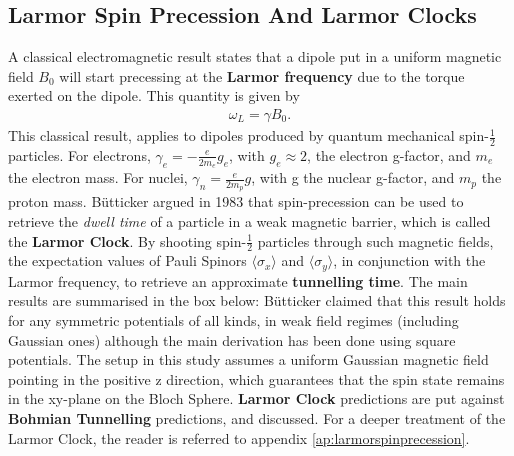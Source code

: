 \subsection{Larmor Spin Precession And Larmor Clocks}
A classical electromagnetic result states that a dipole put in a uniform magnetic field $B_0$ will start precessing at the \textbf{Larmor frequency} due to the torque exerted on the dipole. This quantity is given by
\begin{align}
    \omega_L = \gamma B_0.
\end{align}
This classical result, applies to dipoles produced by quantum mechanical spin-$\frac{1}{2}$ particles. For electrons, $\gamma_e=-\frac{e}{2m_e}g_e$, with $g_e \approx2$, the electron g-factor, and $m_e$ the electron mass. For nuclei, $\gamma_n = \frac{e}{2 m_p}g$, with g the nuclear g-factor, and $m_p$ the proton mass. Bütticker argued in 1983 \cite{Buttiker1983LarmorClock} that spin-precession can be used to retrieve the \textit{dwell time} of a particle in a weak magnetic barrier, which is called the \textbf{Larmor Clock}. By shooting spin-$\frac{1}{2}$ particles through such magnetic fields, the expectation values of Pauli Spinors $\langle \sigma_x \rangle$ and $\langle \sigma_y \rangle$, in conjunction with the Larmor frequency, to retrieve an approximate \textbf{tunnelling time}. The main results are summarised in the box below:
Bütticker claimed that this result holds for any symmetric potentials of all kinds, in weak field regimes (including Gaussian ones) although the main derivation has been done using square potentials. The setup in this study assumes a uniform Gaussian magnetic field pointing in the positive z direction, which guarantees that the spin state remains in the xy-plane on the Bloch Sphere. \textbf{Larmor Clock} predictions are put against \textbf{Bohmian Tunnelling} predictions, and discussed. For a deeper treatment of the Larmor Clock, the reader is referred to appendix \ref{ap:larmorspinprecession}.